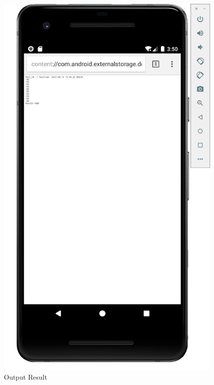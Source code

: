 \begin{figure}[t]
\begin{minipage}[t]{0.48\linewidth}
    \end{minipage}
    \begin{minipage}[t]{0.48\linewidth}
    \centering
      \caption{Output Result}
      \label{fig:test2}
      \includegraphics[width=0.8\columnwidth]{img/test2.png} 
    \end{minipage}
\end{figure}


